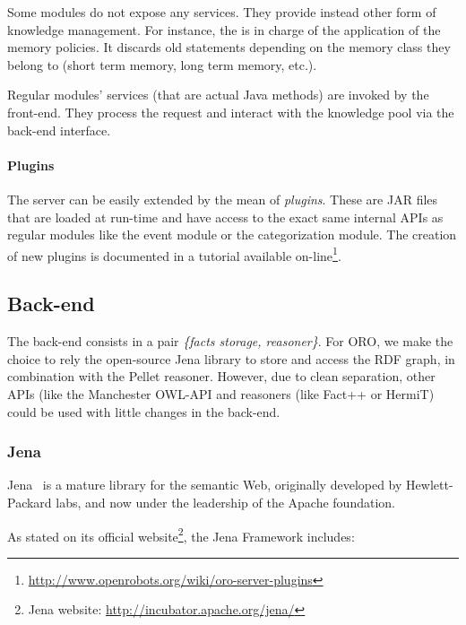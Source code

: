 Some modules do not expose any services. They provide instead other form of
knowledge management. For instance, the  is in charge of
the application of the memory policies. It discards old statements depending on
the memory class they belong to (short term memory, long term memory, etc.).

Regular modules' services (that are actual Java methods) are invoked by the
front-end.  They process the request and interact with the knowledge pool via
the back-end interface.

\paragraph{Plugins} The server can be easily extended by the mean of
\emph{plugins}. These are JAR files that are loaded at run-time and have access
to the exact same internal APIs as regular modules like the event module or the
categorization module. The creation of new plugins is documented in a tutorial
available
on-line\footnote{\url{http://www.openrobots.org/wiki/oro-server-plugins}}.

\subsection{Back-end}
\label{sect|backend}

The back-end consists in a pair \emph{\{facts storage, reasoner\}}. For ORO,
we make the choice to rely the open-source {\sc Jena} library to store and
access the RDF graph, in combination with the {\sc Pellet} reasoner. However,
due to clean separation, other APIs (like the {\sc Manchester OWL-API} and
reasoners (like {\sc Fact++} or {\sc HermiT}) could be used with little changes
in the back-end.

\subsubsection{Jena}
\label{sect|jena}

{\sc Jena}~\cite{McBride2002} is a mature library for the semantic Web,
originally developed by Hewlett-Packard labs, and now under the leadership of
the Apache foundation.

As stated on its official website\footnote{{\sc Jena} website:
\url{http://incubator.apache.org/jena/}}, the Jena Framework includes:

